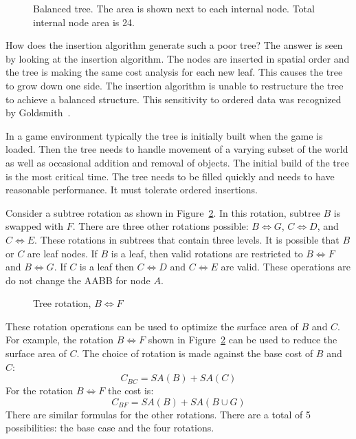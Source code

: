 \documentclass{article}
\begin{document}
\begin{figure}
	\begin{center}
		
	\end{center}
	\caption{Balanced tree. The area is shown next to each internal node. Total internal node area is 24. }
	\label{fig:balanced}
\end{figure}

How does the insertion algorithm generate such a poor tree? The answer is seen by looking at the insertion algorithm. The nodes are inserted in spatial order and the tree is making the same cost analysis for each new leaf. This causes the tree to grow down one side. The insertion algorithm is unable to restructure the tree to achieve a balanced structure. This sensitivity to ordered data was recognized by Goldsmith~\cite{Goldsmith1987}.

In a game environment typically the tree is initially built when the game is loaded. Then the tree needs to handle movement of a varying subset of the world as well as occasional addition and removal of objects. The initial build of the tree is the most critical time. The tree needs to be filled quickly and needs to have reasonable performance. It must tolerate ordered insertions.

Consider a subtree rotation as shown in Figure~\ref{fig:rotate}. In this rotation, subtree $B$ is swapped with $F$. There are three other rotations possible: $B \Leftrightarrow G$, $C \Leftrightarrow D$, and $C \Leftrightarrow E$. These rotations in subtrees that contain three levels. It is possible that $B$ or $C$ are leaf nodes. If $B$ is a leaf, then valid rotations are restricted to $B \Leftrightarrow F$ and $B \Leftrightarrow G$. If $C$ is a leaf then $C \Leftrightarrow D$ and $C \Leftrightarrow E$ are valid. These operations are do not change the AABB for node $A$.

\begin{figure}
	\begin{center}
		
	\end{center}
	\caption{Tree rotation, $B \Leftrightarrow F$ }
	\label{fig:rotate}
\end{figure}

These rotation operations can be used to optimize the surface area of $B$ and $C$. For example, the rotation $B \Leftrightarrow F$ shown in Figure~\ref{fig:rotate} can be used to reduce the surface area of $C$. The choice of rotation is made against the base cost of $B$ and $C$:
\[ C_{BC} = SA(B) + SA(C) \]
For the rotation $B \Leftrightarrow F$ the cost is:
\[ C_{BF} = SA(B) + SA(B \cup G) \]
There are similar formulas for the other rotations. There are a total of 5 possibilities: the base case and the four rotations.
\end{document}
